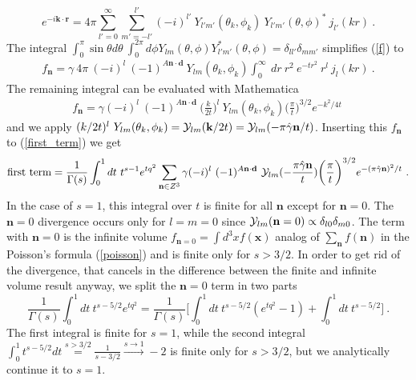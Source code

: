 \documentclass[a4paper,12pt]{book}
\begin{document}
\begin{equation}
e^{-i\mathbf{k}\cdot \mathbf{r}}=4\pi\sum_{l'=0}^\infty \sum_{m'=-l'}^{l'}  (-i)^{l'} ~Y_{l'm'}(\theta_k,\phi_k)~Y_{l'm'}(\theta,\phi)^*~j_{l'}(kr)~.
\end{equation}
The integral $\int_0^\pi \sin\theta d\theta~\int_0^{2\pi} d\phi Y_{lm}(\theta,\phi)Y^*_{l'm'}(\theta,\phi)=\delta_{ll'}\delta_{mm'}$ simplifies (\ref{f})   to 
\begin{align}
f_{\mathbf{n}}= \gamma ~4\pi~(-i)^l~ (-1)^{A\mathbf{n\cdot d}} ~ Y_{lm}(\theta_k,\phi_k) \int_0^\infty ~dr ~ r^2~ e^{-tr^2} ~r^l~ j_l(kr)~.
\end{align}
The remaining integral can be evaluated with Mathematica
\begin{align}
f_{\mathbf{n}}= \gamma (-i)^l~ (-1)^{A\mathbf{n\cdot d}} ~ \biggl(\frac{k}{2t}\biggr)^l~Y_{lm}(\theta_k,\phi_k) \biggl(\frac{\pi}{t}\biggr)^{3/2}  e^{-k^2/4t}~
\end{align} 
and we apply $(k/2t)^l~Y_{lm}(\theta_k,\phi_k)={\cal Y}_{lm}(\mathbf{k}/2t)={\cal Y}_{lm}(-\pi\hat \gamma\mathbf{n}/t)$. Inserting this $f_{\mathbf{n}}$ to (\ref{first_term}) we get
\begin{equation}
\mathrm{first\ term}=\frac{1}{\Gamma(s)} \int _0^1 dt~t^{s-1} e^{tq^2} \sum_{\mathbf{n}\in Z^3} \gamma (-i)^l~ (-1)^{A\mathbf{n\cdot d}} ~ {\cal Y}_{lm}(-\frac{\pi\hat \gamma \mathbf{n}}{t}) \biggl(\frac{\pi}{t}\biggr)^{3/2}  e^{-(\pi \hat \gamma \mathbf{n})^2/t}~.
\end{equation}
In the case of $s=1$, this integral over $t$ is finite for all $\mathbf{n}$ except for $\mathbf{n}=0$. The $\mathbf{n}=0$  divergence occurs only for $l=m=0$ since ${\cal Y}_{lm}(\mathbf{n}=0)\propto \delta_{l0}\delta_{m0}$. The term with $\mathbf{n}=0$  is the infinite volume  $f_{\mathbf{n}=0}=\int d^3x f(\mathbf{x})$  analog of  $\sum_{\mathbf{n}} f(\mathbf{n})$ in the Poisson's formula (\ref{poisson}) and is finite only for $s>3/2$. In order to get rid of the divergence, that cancels in the difference between the finite and infinite volume result anyway, we split the $\mathbf{n}=0$ term in two parts
\begin{equation}
\frac{1}{\Gamma(s)} \int _0^1 dt~t^{s-5/2} e^{tq^2} = \frac{1}{\Gamma(s)} \biggl[\int _0^1 dt~t^{s-5/2} (e^{tq^2}-1)+\int _0^1 dt~t^{s-5/2}\biggr]~.
\end{equation}
The first integral is finite for $s=1$, while the second integral $\int_0^1  t^{s-5/2}dt\stackrel{s>3/2}{ =}\tfrac{1}{s-3/2}\stackrel{s\to  1}{ \longrightarrow}-2 $ is finite only for $s>3/2$, but we analytically continue it to $s=1$.
\end{document}
